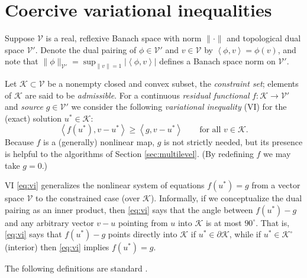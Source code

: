 \documentclass[letterpaper,final,12pt,reqno]{amsart}
\theoremstyle{cstyle}
\theoremstyle{cstyle*}
\theoremstyle{dstyle}
\numberwithin{equation}{section}
\numberwithin{figure}{section}
\numberwithin{table}{section}
\numberwithin{theorem}{section}
\newcommand{\cK}{\mathcal{K}}
\newcommand{\cV}{\mathcal{V}}
\newcommand{\ip}[2]{\left<#1,#2\right>}
\begin{document}


\section{Coercive variational inequalities} \label{sec:vi}

Suppose $\cV$ is a real, reflexive Banach space with norm $\|\cdot\|$ and topological dual space $\cV'$.  Denote the dual pairing of $\phi \in \cV'$ and $v\in\cV$ by $\ip{\phi}{v} = \phi(v)$, and note that $\|\phi\|_{\cV'} = \sup_{\|v\|=1} |\ip{\phi}{v}|$ defines a Banach space norm on $\cV'$.

Let $\cK \subset \cV$ be a nonempty closed and convex subset, the \emph{constraint set}; elements of $\cK$ are said to be \emph{admissible}.  For a continuous \emph{residual functional} $f:\cK \to \cV'$ and \emph{source} $g\in \cV'$ we consider the following \emph{variational inequality} (VI) for the (exact) solution $u^*\in \cK$:
\begin{equation}
\ip{f(u^*)}{v-u^*} \ge \ip{g}{v-u^*} \qquad \text{for all } v\in \cK. \label{eq:vi}
\end{equation}
Because $f$ is a (generally) nonlinear map, $g$ is not strictly needed, but its presence is helpful to the algorithms of Section \ref{sec:multilevel}.  (By redefining $f$ we may take $g=0$.)

VI \eqref{eq:vi} generalizes the nonlinear system of equations $f(u^*)=g$ from a vector space $\cV$ to the constrained case (over $\cK$).  Informally, if we conceptualize the dual pairing as an inner product, then \eqref{eq:vi} says that the angle between $f(u^*)-g$ and any arbitrary vector $v-u$ pointing from $u$ into $\cK$ is at most $90^\circ$.  That is, \eqref{eq:vi} says that $f(u^*)-g$ points directly into $\cK$ if $u^* \in\partial\cK$, while if $u^* \in \cK^\circ$ (interior) then \eqref{eq:vi} implies $f(u^*)=g$.

The following definitions are standard \cite{KinderlehrerStampacchia1980}.
\end{document}
